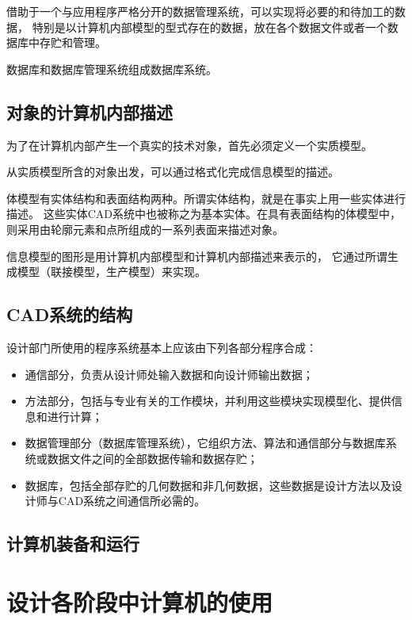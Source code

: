 \documentclass[letterpaper,10pt,english]{sphinxmanual}
\begin{document}
借助于一个与应用程序严格分开的数据管理系统，可以实现将必要的和待加工的数据，
特别是以计算机内部模型的型式存在的数据，放在各个数据文件或者一个数据库中存贮和管理。

数据库和数据库管理系统组成数据库系统。


\subsection{对象的计算机内部描述}
\label{unit10:id4}
为了在计算机内部产生一个真实的技术对象，首先必须定义一个实质模型。

从实质模型所含的对象出发，可以通过格式化完成信息模型的描述。

体模型有实体结构和表面结构两种。所谓实体结构，就是在事实上用一些实体进行描述。
这些实体CAD系统中也被称之为基本实体。在具有表面结构的体模型中，
则采用由轮廓元素和点所组成的一系列表面来描述对象。

信息模型的图形是用计算机内部模型和计算机内部描述来表示的，
它通过所谓生成模型（联接模型，生产模型）来实现。


\subsection{CAD系统的结构}
\label{unit10:cad}
设计部门所使用的程序系统基本上应该由下列各部分程序合成：
\begin{itemize}
\item {} 
通信部分，负责从设计师处输入数据和向设计师输出数据；

\item {} 
方法部分，包括与专业有关的工作模块，并利用这些模块实现模型化、提供信息和进行计算；

\item {} 
数据管理部分（数据库管理系统），它组织方法、算法和通信部分与数据库系统或数据文件之间的全部数据传输和数据存贮；

\item {} 
数据库，包括全部存贮的几何数据和非几何数据，这些数据是设计方法以及设计师与CAD系统之间通信所必需的。

\end{itemize}


\subsection{计算机装备和运行}
\label{unit10:id5}

\section{设计各阶段中计算机的使用}
\label{unit10:id6}
\end{document}
